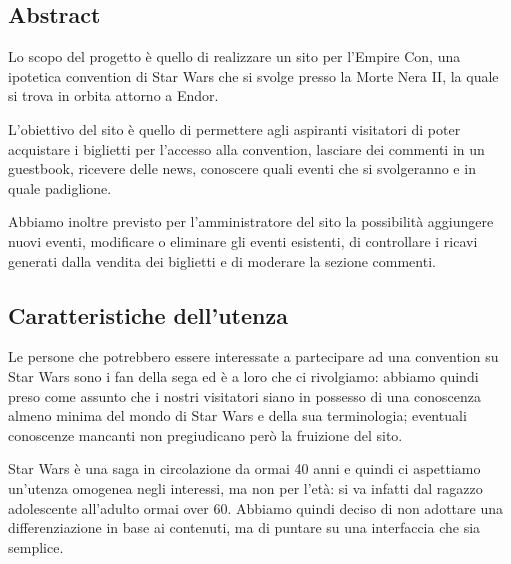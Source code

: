 \subsection{Abstract}
Lo scopo del progetto è quello di realizzare un sito per l'Empire Con, una ipotetica convention di Star Wars che si svolge presso la Morte Nera II, la quale si trova in orbita attorno a Endor.

L'obiettivo del sito è quello di permettere agli aspiranti visitatori di poter acquistare i biglietti per l'accesso alla convention, lasciare dei commenti in un guestbook, ricevere delle news, conoscere quali eventi che si svolgeranno e in quale padiglione.

Abbiamo inoltre previsto per l'amministratore del sito la possibilità aggiungere nuovi eventi, modificare o eliminare gli eventi esistenti, di controllare i ricavi generati dalla vendita dei biglietti e di moderare la sezione commenti.
\subsection{Caratteristiche dell’utenza}
Le persone che potrebbero essere interessate a partecipare ad una convention su Star Wars sono i fan della sega ed è a loro che ci rivolgiamo: abbiamo quindi preso come assunto che i nostri visitatori siano in possesso di una conoscenza almeno minima del mondo di Star Wars e della sua terminologia; eventuali conoscenze mancanti non pregiudicano però la fruizione del sito.

Star Wars è una saga in circolazione da ormai 40 anni e quindi ci aspettiamo un'utenza omogenea negli interessi, ma non per l'età: si va infatti dal ragazzo adolescente all'adulto ormai over 60.
Abbiamo quindi deciso di non adottare una differenziazione in base ai contenuti, ma di puntare su una interfaccia che sia semplice.